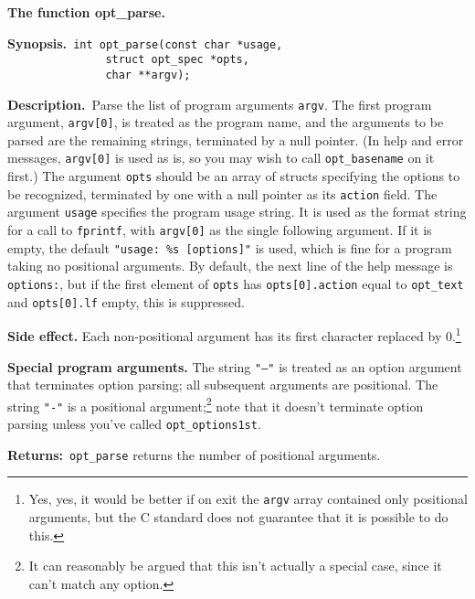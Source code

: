 \documentclass{article}
\newenvironment{chunk}[1]
{\par\smallskip\noindent\textbf{#1.}\par\nopagebreak}
{\par\smallskip}
\renewcommand{\tt}{\texttt}
\newcommand{\synopsis}{\par\noindent\textbf{Synopsis.}}
\newcommand{\synocont}{\\\phantom{\textbf{Synopsis.}}}
\newcommand{\descr}{\par\noindent\textbf{Description.}\ }
\newcommand{\return}{\par\noindent\textbf{Returns:}\ }
\begin{document}
\begin{chunk}{The function opt\_parse}
  \synopsis\verb+ int opt_parse(const char *usage, +
  \synocont\verb+               struct opt_spec *opts,+
  \synocont\verb+               char **argv);+
  \descr Parse the list of program arguments \tt{argv}. 
  The first program argument, \tt{argv[0]}, is treated as the program
  name, and the 
  arguments to be parsed are the remaining strings, terminated by a null
  pointer. (In help and error messages, \tt{argv[0]} is used as
  is, so you may wish to call \tt{opt\_basename} on it first.) The
  argument \tt{opts} should be an array of 
  structs specifying the options to be recognized, terminated by one
  with a null pointer as its \tt{action} field. The argument
  \tt{usage} specifies the program usage string. It is
  used as the format string for a call to \tt{fprintf}, with
  \tt{argv[0]} as the single following argument. If it is empty,
  the default \verb+"usage: %s [options]"+ is used, which is fine
  for a program taking no positional arguments. By default, the next
  line of the help message is \tt{options:}, but if the first
  element of \tt{opts} has \tt{opts[0].action} equal to \tt{opt\_text}
  and \tt{opts[0].lf} empty, this is suppressed.

  \noindent\textbf{Side effect.} Each non-positional argument has its first
  character replaced by 0.\footnote{\label{fn:why0}Yes, yes, it would
    be better if on exit the \tt{argv} array contained only positional
    arguments, but the C standard does not guarantee that it is
    possible to do this.} 

  \noindent\textbf{Special program arguments.} The string \tt{"--"} is treated
  as an option argument that terminates option parsing; all subsequent
  arguments are positional. The string \tt{"-"} is a positional
  argument;\footnote{It can reasonably be argued that this isn't
    actually a special case, since it can't match any option.} note
  that it doesn't terminate option parsing unless you've called
  \tt{opt\_options1st}. 
  
  \return \tt{opt\_parse} returns the number of
  positional arguments.
\end{chunk}
\end{document}
